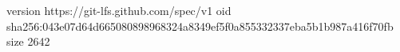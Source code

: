 version https://git-lfs.github.com/spec/v1
oid sha256:043e07d64d665080898968324a8349ef5f0a855332337eba5b1b987a416f70fb
size 2642
